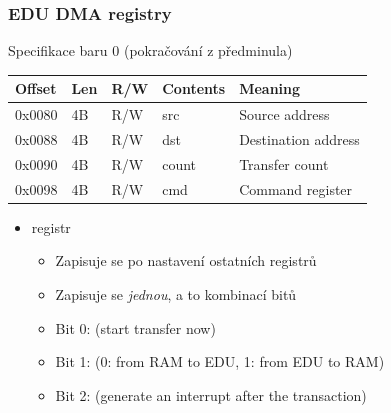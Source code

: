 \begin{frame}
  \frametitle{EDU DMA registry}

\begin{block}{Specifikace baru 0 (pokračování z předminula)}
\begin{center}
\begin{table}
\footnotesize
\begin{tabular}{|l|l|l|l|l|} \hline
Offset & Len & R/W & Contents & Meaning \\ \hline\hline
0x0080 & 4B  & R/W & src      & Source address \\ \hline
0x0088 & 4B  & R/W & dst      & Destination address \\ \hline
0x0090 & 4B  & R/W & count    & Transfer count \\ \hline
0x0098 & 4B  & R/W & cmd      & Command register \\ \hline
\end{tabular}
\end{table}
\end{center}
\end{block}

  \pause

  \begin{itemize}
    \item {} registr
    \begin{itemize}
      \item Zapisuje se po nastavení ostatních registrů
      \item Zapisuje se \emph{jednou}, a to kombinací bitů
      \item Bit 0:  (start transfer now)
      \item Bit 1:  (0: from RAM to EDU, 1: from EDU to RAM)
      \item Bit 2:  (generate an interrupt after the transaction)
    \end{itemize}
  \end{itemize}

\end{frame}

